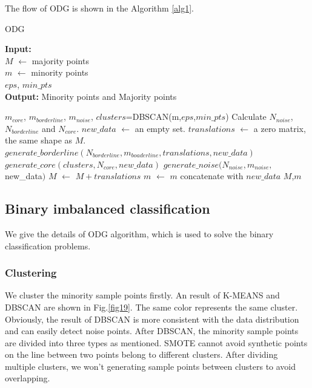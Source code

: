 \documentclass[runningheads]{llncs}
\begin{document}
The flow of ODG is shown in the Algorithm \ref{alg1}.
\begin{algorithm}[tbp]
  \caption{ODG} %
  \label{alg1}
  \hspace*{0.02in} {\bf Input:}
   \\$M$ $\leftarrow$ majority points  \\
   $m$ $\leftarrow$ minority points  \\
   $eps$, $min\_pts$\\
  \hspace*{0.02in} {\bf Output:} %
  Minority points and Majority points
  \begin{algorithmic}[1]
  \State $m_{core}$, $m_{borderline}$, $m_{noise}$, $clusters$=DBSCAN(m,$eps$,$min\_pts$) %
  \State Calculate $N_{noise}$, $N_{borderline}$ and $N_{core}$.
  \State $new\_data$ $\leftarrow$ an empty set.
  \State $translations$ $\leftarrow$ a zero matrix, the same shape as $M$.
  \State $generate\_borderline(N_{borderline},m_{boaderline},translations, new\_data)$
  \State $generate\_core(clusters,N_{core},new\_data)$
  \State $generate\_noise(N_{noise},m_{noise},$new\_data$)$
  \State $M$ $\leftarrow$ $M+translations$
  \State $m$ $\leftarrow$ $m$ concatenate with $new\_data$
  \State \Return $M$,$m$
  \end{algorithmic}
  \end{algorithm}
\subsection{Binary imbalanced classification}
We give the details of ODG algorithm, which is used to solve the binary classification problems.
\subsubsection{Clustering}
We cluster the minority sample points firstly.
An result of K-MEANS and DBSCAN are shown in Fig.\ref{fig19}.
The same color represents the same cluster.
Obviously, the result of DBSCAN is more 
consistent with the data distribution and can easily detect noise points.
After DBSCAN, 
the minority sample points are divided into three types as mentioned.
SMOTE cannot avoid synthetic points on the line between 
two points belong to different clusters.
After dividing multiple clusters, 
we won't generating sample points between clusters to avoid overlapping.
\end{document}
